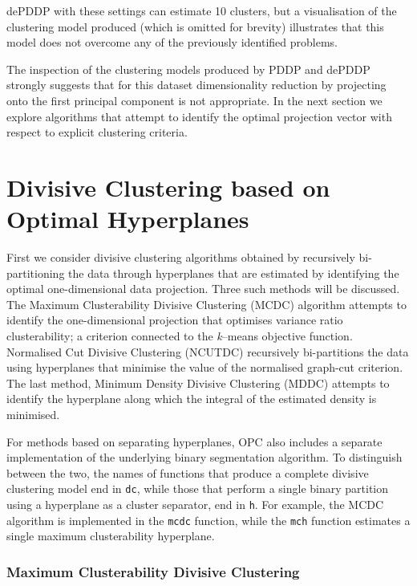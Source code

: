 \documentclass{book}
\begin{document}
\noindent
%
dePDDP with these settings can estimate
10 clusters, but a visualisation of the clustering model produced (which is
omitted for brevity) illustrates that this model does not overcome any of
the previously identified problems.


The inspection of the clustering models produced by PDDP and dePDDP strongly
suggests that for this dataset dimensionality reduction by projecting onto the
first principal component is not appropriate.
%
In the next section we explore algorithms that attempt to identify the optimal
projection vector with respect to explicit clustering criteria.
%

\section{Divisive Clustering based on Optimal Hyperplanes}

First we consider divisive clustering algorithms obtained by recursively
bi-partitioning the data through hyperplanes that are estimated by identifying
the optimal one-dimensional data projection. Three such methods will be
discussed.  The Maximum Clusterability Divisive Clustering (MCDC) algorithm
attempts to identify the one-dimensional projection that optimises variance
ratio clusterability; a criterion connected to the {\it k}--means objective
function. Normalised Cut Divisive Clustering (NCUTDC) recursively bi-partitions the data using hyperplanes
that minimise the value of the normalised graph-cut criterion.
The last method, Minimum Density Divisive Clustering (MDDC) attempts
to identify the hyperplane along which the integral of the estimated density is
minimised.


For methods based on separating hyperplanes, OPC also includes a separate
implementation of the underlying binary segmentation algorithm. To distinguish between the two,
the names of functions that produce a complete divisive clustering model end in {\tt dc},
while those that perform a single binary partition using a hyperplane as a
cluster separator, end in {\tt h}.
%
For example, the MCDC algorithm is implemented in the {\tt mcdc} function,
while the {\tt mch} function estimates a single maximum clusterability
hyperplane.

\subsubsection{Maximum Clusterability Divisive Clustering}
\end{document}
